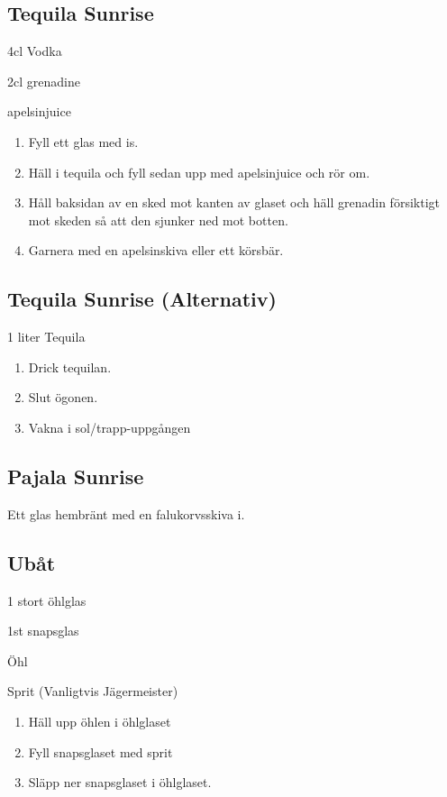 \subsection{\textbf{Tequila Sunrise}}

4cl Vodka

2cl grenadine

apelsinjuice

\begin{enumerate}
    \item Fyll ett glas med is.
    \item Häll i tequila och fyll sedan upp med apelsinjuice och rör om.
    \item Håll baksidan av en sked mot kanten av glaset och häll grenadin försiktigt mot skeden så att den sjunker ned mot botten.
    \item Garnera med en apelsinskiva eller ett körsbär.
\end{enumerate}

\subsection{\textbf{Tequila Sunrise (Alternativ)}}

1 liter Tequila

\begin{enumerate}
    \item Drick tequilan.
    \item Slut ögonen.
    \item Vakna i sol/trapp-uppgången
\end{enumerate}



\subsection{\textbf{Pajala Sunrise}}

Ett glas hembränt med en falukorvsskiva i.

\subsection{\textbf{Ubåt}}

1 stort öhlglas

1st snapsglas

Öhl

Sprit (Vanligtvis Jägermeister)

\begin{enumerate}
    \item Häll upp öhlen i öhlglaset
    \item Fyll snapsglaset med sprit
    \item Släpp ner snapsglaset i öhlglaset.
\end{enumerate}


